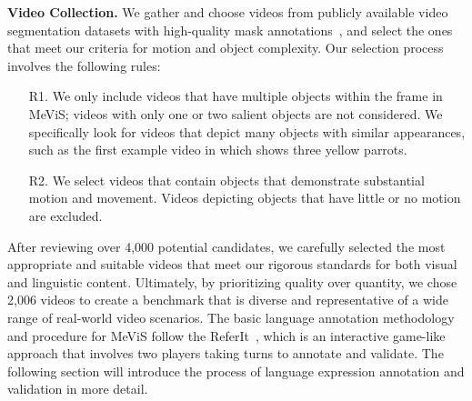 \documentclass[10pt,twocolumn,letterpaper]{article}
\newcommand{\myparagraph}[1]{{\vspace{.5em} \noindent \bf #1}}
\newcommand{\numvideo}{2,006\xspace}
\newcommand{\ourdataset}{MeViS\xspace}
\begin{document}
\myparagraph{Video Collection.} We gather and choose videos from publicly available video segmentation datasets with high-quality mask annotations~\cite{OVIS,UVO,TAOVOS,MOSE}, and select the ones that meet our criteria for motion and object complexity. Our selection process involves the following rules:
\begin{itemize}
\setlength\itemsep{0em}
\vspace{-1mm}
\item[R1.] We only include videos that have multiple objects within the frame in \ourdataset; videos with only one or two salient objects are not considered. We specifically look for videos that depict many objects with similar appearances, such as the first example video in  which shows three yellow parrots.
\vspace{-1mm}

\item[R2.] We select videos that contain objects that demonstrate substantial motion and movement. Videos depicting objects that have little or no motion are excluded.
\vspace{-1mm}
\end{itemize}
\vspace{-1mm}

After reviewing over 4,000 potential candidates, we carefully selected the most appropriate and suitable videos that meet our rigorous standards for both visual and linguistic content. Ultimately, by prioritizing quality over quantity, we chose \numvideo videos to create a benchmark that is diverse and representative of a wide range of real-world video scenarios. The basic language annotation methodology and procedure for \ourdataset follow the ReferIt~\cite{kazemzadeh-etal-2014-referitgame}, which is an interactive game-like approach that involves two players taking turns to annotate and validate. The following section will introduce the process of language expression annotation and validation in more detail.
\end{document}
